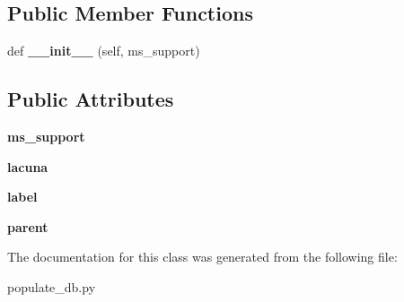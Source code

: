\subsection*{Public Member Functions}
\begin{DoxyCompactItemize}
\item 
\mbox{\label{classCBGM_1_1populate__db_1_1LacunaReading_a33efe72a86dd1f989b51e358f41cd5b4}} 
def {\bfseries \+\_\+\+\_\+init\+\_\+\+\_\+} (self, ms\+\_\+support)
\end{DoxyCompactItemize}
\subsection*{Public Attributes}
\begin{DoxyCompactItemize}
\item 
\mbox{\label{classCBGM_1_1populate__db_1_1LacunaReading_a1abf40c9cbdbf175a146a70368ff2758}} 
{\bfseries ms\+\_\+support}
\item 
\mbox{\label{classCBGM_1_1populate__db_1_1LacunaReading_a2c93f9c12970d94fcd70e2a669a9ed8c}} 
{\bfseries lacuna}
\item 
\mbox{\label{classCBGM_1_1populate__db_1_1LacunaReading_a9552c1d698d061f05ff92c0c380e9546}} 
{\bfseries label}
\item 
\mbox{\label{classCBGM_1_1populate__db_1_1LacunaReading_a4253a4c06320743e9951c48558a99b05}} 
{\bfseries parent}
\end{DoxyCompactItemize}


The documentation for this class was generated from the following file\+:\begin{DoxyCompactItemize}
\item 
populate\+\_\+db.\+py\end{DoxyCompactItemize}
